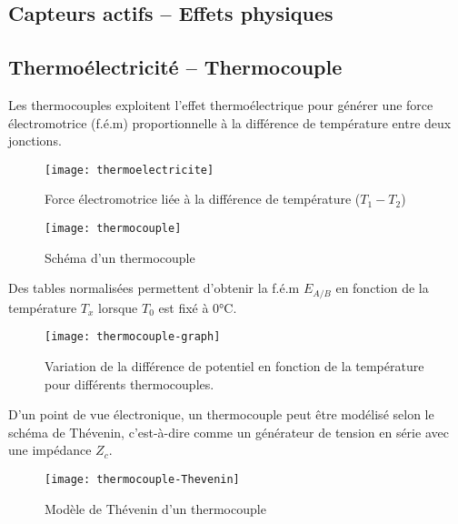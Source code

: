 \subsection*{Capteurs actifs – Effets physiques}

\subsection*{Thermoélectricité – Thermocouple}
Les thermocouples exploitent l'effet thermoélectrique pour générer une force 
électromotrice (f.é.m) proportionnelle à la différence de température entre deux 
jonctions.  

\begin{minipage}{0.49\textwidth}
    \begin{figure}[H]
        \centering
        \texttt{[image: thermoelectricite]}
        \caption{Force électromotrice liée à la différence de température (\(T_1-T_2\))}
        \label{fig:thermoelectricite}
    \end{figure}
\end{minipage}
\begin{minipage}{0.5\textwidth}
    \begin{figure}[H]
        \centering
        \texttt{[image: thermocouple]}
        \caption{Schéma d'un thermocouple}
        \label{fig:thermocouple}
    \end{figure}
\end{minipage}

Des tables normalisées permettent d'obtenir la f.é.m $E_{A/B}$ en fonction de la 
température $T_x$ lorsque $T_0$ est fixé à 0°C.

\begin{figure}[H]
    \centering
    \texttt{[image: thermocouple-graph]}
    \caption{Variation de la différence de potentiel en fonction de la 
    température pour différents thermocouples.}
    \label{fig:thermocouple_graph}
\end{figure}

D'un point de vue électronique, un thermocouple peut être modélisé selon le 
schéma de Thévenin, c'est-à-dire comme un générateur de tension en série avec 
une impédance $Z_c$.  

\begin{figure}[H]
    \centering
    \texttt{[image: thermocouple-Thevenin]}
    \caption{Modèle de Thévenin d'un thermocouple}
    \label{fig:thermocouple_thevenin}    
\end{figure}

